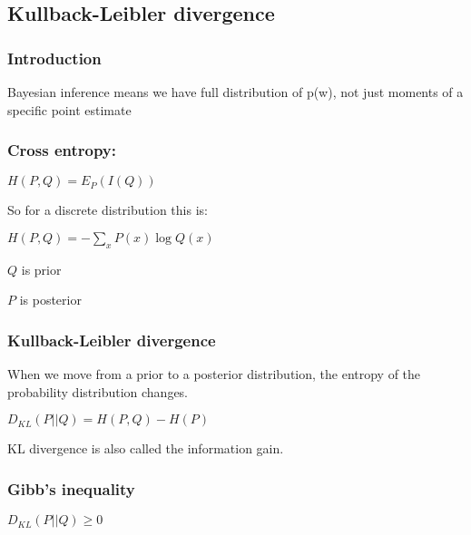 
\subsection{Kullback-Leibler divergence}
\subsubsection{Introduction}

Bayesian inference means we have full distribution of p(w), not just moments of a specific point estimate

\subsubsection{Cross entropy:}

\(H(P,Q)=E_P(I(Q))\)

So for a discrete distribution this is:

\(H(P,Q)=-\sum_x P(x)\log Q(x)\)

\(Q\) is prior

\(P\) is posterior

\subsubsection{Kullback-Leibler divergence}

When we move from a prior to a posterior distribution, the entropy of the probability distribution changes.

\(D_{KL}(P||Q)=H(P,Q)-H(P)\)

KL divergence is also called the information gain.

\subsubsection{Gibb's inequality}

\(D_{KL}(P||Q)\ge 0\)

